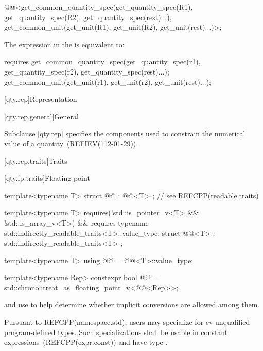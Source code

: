 \begin{itemdescr}
\pnum
\returns
\begin{codeblock}
@@<get_common_quantity_spec(get_quantity_spec(R1{}), get_quantity_spec(R2{}),
                                     get_quantity_spec(rest)...),
            get_common_unit(get_unit(R1{}), get_unit(R2{}), get_unit(rest)...)>{};
\end{codeblock}

\pnum
\remarks
The expression in the  is equivalent to:
\begin{codeblock}
requires {
  get_common_quantity_spec(get_quantity_spec(r1), get_quantity_spec(r2),
                           get_quantity_spec(rest)...);
  get_common_unit(get_unit(r1), get_unit(r2), get_unit(rest)...);
}
\end{codeblock}
\end{itemdescr}

[qty.rep]{Representation}

[qty.rep.general]{General}

\pnum
Subclause \ref{qty.rep} specifies the components
used to constrain the numerical value of a quantity~(REFIEV(112-01-29)).

[qty.rep.traits]{Traits}

[qty.fp.traits]{Floating-point}

\begin{itemdecl}
template<typename T>
struct @@ : @@<T> {}; // see REFCPP(readable.traits)

template<typename T>
  requires(!std::is_pointer_v<T> && !std::is_array_v<T>) &&
          requires { typename std::indirectly_readable_traits<T>::value_type; }
struct @@<T> : std::indirectly_readable_traits<T> {};

template<typename T>
using @@ = @@<T>::value_type;

template<typename Rep>
constexpr bool @@ =
  std::chrono::treat_as_floating_point_v<@@<Rep>>;
\end{itemdecl}

\begin{itemdescr}
\pnum
{} and  use 
to help determine whether implicit conversions are allowed among them.

\pnum
\remarks
Pursuant to REFCPP(namespace.std),
users may specialize 
for cv-unqualified program-defined types.
Such specializations shall be usable in constant expressions~(REFCPP(expr.const))
and have type .
\end{itemdescr}

